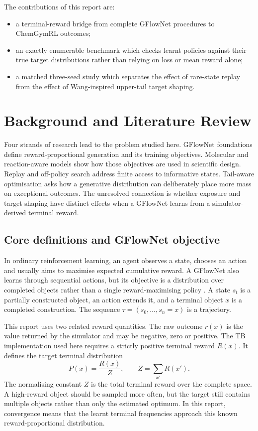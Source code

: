 \documentclass{article}
\begin{document}
The contributions of this report are:
\begin{itemize}
    \item a terminal-reward bridge from complete GFlowNet procedures to ChemGymRL outcomes;
    \item an exactly enumerable benchmark which checks learnt policies against their true target distributions rather than relying on loss or mean reward alone;
    \item a matched three-seed study which separates the effect of rare-state replay from the effect of Wang-inspired upper-tail target shaping.
\end{itemize}

\section{Background and Literature Review}

Four strands of research lead to the problem studied here. GFlowNet foundations define reward-proportional generation and its training objectives. Molecular and reaction-aware models show how those objectives are used in scientific design. Replay and off-policy search address finite access to informative states. Tail-aware optimisation asks how a generative distribution can deliberately place more mass on exceptional outcomes. The unresolved connection is whether exposure and target shaping have distinct effects when a GFlowNet learns from a simulator-derived terminal reward.

\subsection{Core definitions and GFlowNet objective}

In ordinary reinforcement learning, an agent observes a state, chooses an action and usually aims to maximise expected cumulative reward. A GFlowNet also learns through sequential actions, but its objective is a distribution over completed objects rather than a single reward-maximising policy \citep{bengio2021flow,bengio2023foundations}. A state $s_t$ is a partially constructed object, an action extends it, and a terminal object $x$ is a completed construction. The sequence $\tau=(s_0,\ldots,s_n=x)$ is a trajectory.

This report uses two related reward quantities. The raw outcome $r(x)$ is the value returned by the simulator and may be negative, zero or positive. The TB implementation used here requires a strictly positive terminal reward $R(x)$. It defines the target terminal distribution
\begin{equation}
P(x)=\frac{R(x)}{Z}, \qquad Z=\sum_{x'}R(x').
\end{equation}
The normalising constant $Z$ is the total terminal reward over the complete space. A high-reward object should be sampled more often, but the target still contains multiple objects rather than only the estimated optimum. In this report, convergence means that the learnt terminal frequencies approach this known reward-proportional distribution.
\end{document}
